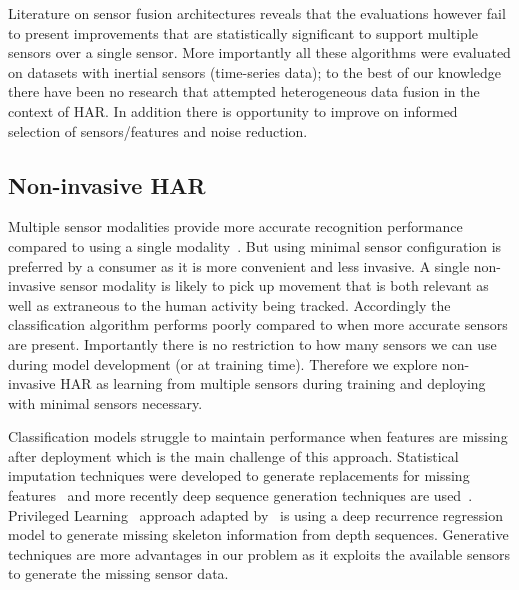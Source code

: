 \documentclass[runningheads]{llncs}
\begin{document}
Literature on sensor fusion architectures reveals that the evaluations however fail to present improvements that are statistically significant to support multiple sensors over a single sensor. More importantly all these algorithms were evaluated on datasets with inertial sensors (time-series data); to the best of our knowledge there have been no research that attempted heterogeneous data fusion in the context of HAR. In addition there is opportunity to improve on informed selection of sensors/features and noise reduction.

\subsection{Non-invasive HAR}
Multiple sensor modalities provide more accurate recognition performance compared to using a single modality~\cite{radu2016towards}. But using minimal sensor configuration is preferred by a consumer as it is more convenient and less invasive. A single non-invasive sensor modality is likely to pick up movement that is both relevant as well as extraneous to the human activity being tracked. Accordingly the classification algorithm performs poorly compared to when more accurate sensors are present. 
Importantly there is no restriction to how many sensors we can use during model development (or at training time). Therefore we explore non-invasive HAR as  learning from multiple sensors during training and deploying with minimal sensors necessary.

Classification models struggle to maintain performance when features are missing after deployment which is the main challenge of this approach. Statistical imputation techniques were developed to generate replacements for missing features~\cite{garcia2009k,little2014statistical} and more recently deep sequence generation techniques are used~\cite{shi2017learning}. Privileged Learning~\cite{vapnik2009new} approach adapted by~\cite{shi2017learning} is using a deep recurrence regression model to generate missing skeleton information from depth sequences. Generative techniques are more advantages in our problem as it exploits the available sensors to generate the missing sensor data. 
\end{document}
